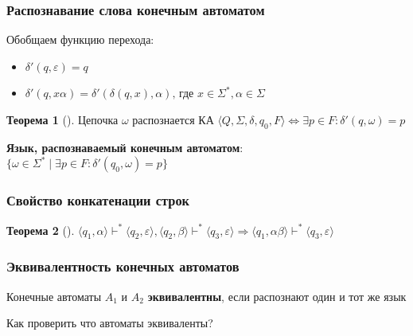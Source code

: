 \documentclass{beamer}
\newtheorem{rutheorem}{Теорема}
\def\iff{\Leftrightarrow}
\begin{document}
\begin{frame}[fragile]
  \transwipe[direction=90]
  \frametitle{Распознавание слова конечным автоматом}
   Обобщаем функцию перехода:
 
      \begin{itemize}
        \item $\delta' (q, \varepsilon) = q$
        \item $\delta' (q, x\alpha) = \delta'(\delta(q, x), \alpha) \text{, где } x \in \Sigma^*, \alpha \in \Sigma$
      \end{itemize}

  \begin{rutheorem}[]   
     $\text{Цепочка } \omega \textbf{ распознается} \text{ КА } \langle Q, \Sigma, \delta, q_0, F \rangle \iff \exists p \in F : \delta'(q, \omega) = p$
  \end{rutheorem}  
   

\begin{center}
     \textbf{Язык, распознаваемый конечным автоматом}: $\{ \omega \in \Sigma^* \mid \exists p \in F : \delta'(q_0, \omega) = p \}$
\end{center}
\end{frame}


\begin{frame}[fragile]
  \transwipe[direction=90]
  \frametitle{Свойство конкатенации строк}
  \begin{rutheorem}[]   
    $\langle q_1 , \alpha \rangle \vdash^* \langle q_2 , \varepsilon \rangle, \langle q_2 , \beta \rangle \vdash^* \langle q_3 , \varepsilon \rangle \Rightarrow \langle q_1 , \alpha \beta \rangle \vdash^* \langle q_3 , \varepsilon \rangle$
  \end{rutheorem}
\end{frame}


\begin{frame}[fragile]
  \transwipe[direction=90]
  \frametitle{Эквивалентность конечных автоматов}
    \begin{center}
      Конечные автоматы $A_1$ и $A_2$ \textbf{эквивалентны}, если распознают один и тот же язык
    \end{center}
  
    \vspace{20pt}

    \begin{center} 
      Как проверить что автоматы эквиваленты?
    \end{center}

\end{frame}
\end{document}
